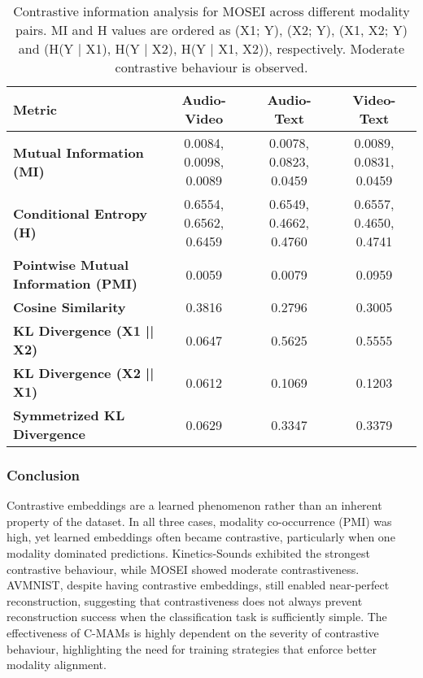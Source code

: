 \begin{table}[h!]
    \centering
    \caption{Contrastive information analysis for MOSEI across different modality pairs. MI and H values are ordered as (X1; Y), (X2; Y), (X1, X2; Y) and (H(Y | X1), H(Y | X2), H(Y | X1, X2)), respectively. Moderate contrastive behaviour is observed.}
    \label{tab:mosei_contrastive}
    \begin{tabular}{l|c|c|c}
    \hline
    \textbf{Metric} & \textbf{Audio-Video} & \textbf{Audio-Text} & \textbf{Video-Text} \\ \hline
    \textbf{Mutual Information (MI)} & 0.0084, 0.0098, 0.0089 & 0.0078, 0.0823, 0.0459 & 0.0089, 0.0831, 0.0459 \\
    \textbf{Conditional Entropy (H)} & 0.6554, 0.6562, 0.6459 & 0.6549, 0.4662, 0.4760 & 0.6557, 0.4650, 0.4741 \\
    \textbf{Pointwise Mutual Information (PMI)} & 0.0059 & 0.0079 & 0.0959 \\
    \textbf{Cosine Similarity} & 0.3816 & 0.2796 & 0.3005 \\
    \textbf{KL Divergence (X1 || X2)} & 0.0647 & 0.5625 & 0.5555 \\
    \textbf{KL Divergence (X2 || X1)} & 0.0612 & 0.1069 & 0.1203 \\
    \textbf{Symmetrized KL Divergence} & 0.0629 & 0.3347 & 0.3379 \\ \hline
    \end{tabular}%
\end{table}

\subsubsection{Conclusion}

Contrastive embeddings are a learned phenomenon rather than an inherent property of the dataset. In all three cases, modality co-occurrence (PMI) was high, yet learned embeddings often became contrastive, particularly when one modality dominated predictions. Kinetics-Sounds exhibited the strongest contrastive behaviour, while MOSEI showed moderate contrastiveness. AVMNIST, despite having contrastive embeddings, still enabled near-perfect reconstruction, suggesting that contrastiveness does not always prevent reconstruction success when the classification task is sufficiently simple. The effectiveness of C-MAMs is highly dependent on the severity of contrastive behaviour, highlighting the need for training strategies that enforce better modality alignment.

